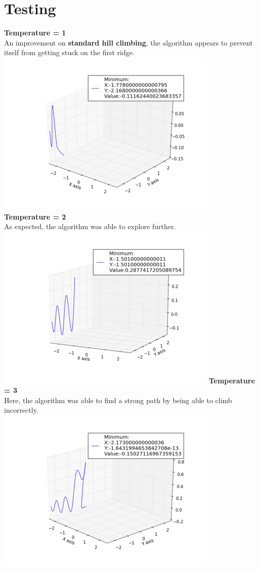 \documentclass[]{report}
\begin{document}
	\section{Testing}
	\textbf{Temperature = 1}\\
	An improvement on \textbf{standard hill climbing}, the algorithm appears to prevent itself from getting stuck on the first ridge.\\
	\includegraphics{sa1}\\
	\textbf{Temperature = 2}\\
	As expected, the algorithm was able to explore further.\\
	\includegraphics{sa2}\newpage
	\textbf{Temperature = 3}\\
	Here, the algorithm was able to find a strong path by being able to climb incorrectly.\\
	\includegraphics{sa3}\\
\end{document}
